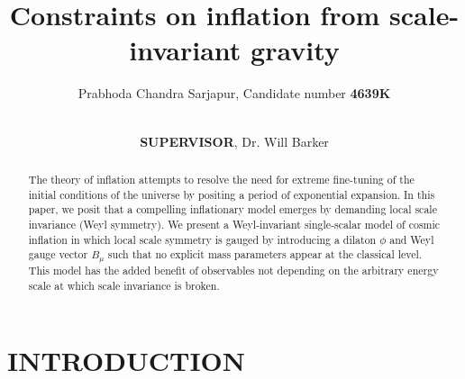 \documentclass[aps,prd,reprint,preprintnumbers,showpacs,floatfix,nofootinbib,superscript address]{revtex4-2}
\newcommand{\wb}[1]{{\color[RGB]{255,0,0}{\textbf{\textit{[WB: #1]}}}}}
\newcommand{\pcs}[1]{{\color[RGB]{0,100,0}{\textbf{\textit{[PCS: #1]}}}}}
\begin{document}
\title{Constraints on inflation from scale-invariant gravity}

\author{Prabhoda Chandra Sarjapur, Candidate number \textbf{4639K}}

\author{\\\textbf{SUPERVISOR}, Dr. Will Barker}

\begin{abstract}
The theory of inflation attempts to resolve the need for extreme fine-tuning of the initial conditions of the universe by positing a period of exponential expansion. In this paper, we posit that a compelling inflationary model emerges by demanding local scale invariance (Weyl symmetry). We present a Weyl‐invariant single‐scalar model of cosmic inflation in which local scale symmetry is gauged by introducing a dilaton $\phi$ and Weyl gauge vector $B_\mu$ such that no explicit mass parameters appear at the classical level. This model has the added benefit of observables not depending on the arbitrary energy scale at which scale invariance is broken. 
\end{abstract}

\maketitle
\section{INTRODUCTION} \label{Introduction}

\end{document}
